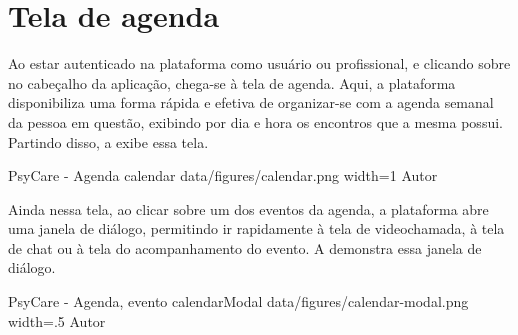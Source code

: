 \section{Tela de agenda}
\label{sec:agenda}

Ao estar autenticado na plataforma como usuário ou profissional, e clicando sobre  no cabeçalho da aplicação, chega-se à tela de agenda. Aqui, a plataforma disponibiliza uma forma rápida e efetiva de organizar-se com a agenda semanal da pessoa em questão, exibindo por dia e hora os encontros que a mesma possui. Partindo disso, a  exibe essa tela.

\image
    {PsyCare - Agenda}
    {calendar}
    {data/figures/calendar.png}
    {width=1\textwidth}
    {Autor}

Ainda nessa tela, ao clicar sobre um dos eventos da agenda, a plataforma abre uma janela de diálogo, permitindo ir rapidamente à tela de videochamada, à tela de chat ou à tela do acompanhamento do evento. A  demonstra essa janela de diálogo.

\image
    {PsyCare - Agenda, evento}
    {calendarModal}
    {data/figures/calendar-modal.png}
    {width=.5\textwidth}
    {Autor}